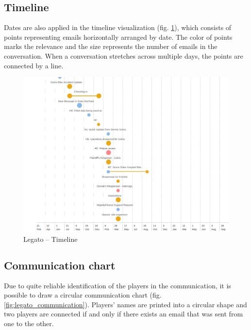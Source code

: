 \documentclass[
  digital, %
  table,   %
  lof,     %
  lot,     %
]{fithesis3}
\begin{document}
\subsection*{Timeline}
Dates are also applied in the timeline visualization (fig. \ref{fig:legato_timeline}), which consists of points representing emails horizontally arranged by date.
The color of points marks the relevance and the size represents the number of emails in the conversation.
When a conversation stretches across multiple days, the points are connected by a line.

\begin{figure}[h]
\caption{Legato -- Timeline}
\label{fig:legato_timeline}
\includegraphics[width=\textwidth]{img/Legato-Timeline}
\end{figure}

\subsection*{Communication chart}
Due to quite reliable identification of the players in the communication, it is possible to draw a circular communication chart (fig. \ref{fig:legato_communication}).
Players' names are printed into a circular shape and two players are connected if and only if there exists an email that was sent from one to the other.
\end{document}
